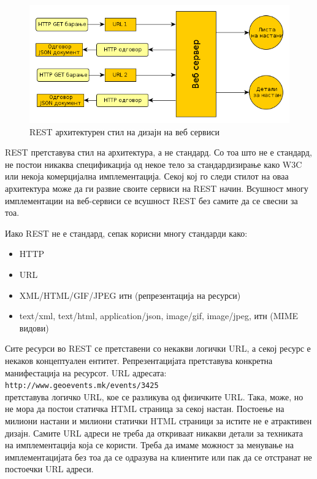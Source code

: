 \begin{figure}[htb]
\centering
\includegraphics[scale=0.4]{images/rest_architecture}
\caption{REST архитектурен стил на дизајн на веб сервиси}
\label{fig:rest_architecture}
\end{figure}
 
REST претставува стил
на архитектура, а не стандард. Со тоа што не е стандард, не постои никаква
спецификација од некое тело за стандардизирање како W3C или некоја комерцијална
имплементација. Секој кој го следи стилот на оваа архитектура може да ги развие
своите сервиси на REST начин. Всушност многу имплементации на веб-сервиси се
всушност REST без самите да се свесни за тоа. 

Иако REST не е стандард, сепак корисни многу стандарди како:
\begin{itemize}
  \item HTTP
  \item URL
  \item XML/HTML/GIF/JPEG итн (репрезентација на ресурси)
  \item text/xml, text/html, application/json, image/gif, image/jpeg, итн (MIME
видови) 
\end{itemize}
 
Сите ресурси во REST се претставени со некакви логички URL, а секој
ресурс е некаков концептуален ентитет. Репрезентацијата претставува конкретна
манифестација на ресурсот. URL адресата:
\\[.5cm]
\texttt{http://www.geoevents.mk/events/3425}
\\[.5cm]

претставува логичко URL, кое се разликува од физичките URL. Така, може, но не
мора да постои статичка HTML страница за секој настан. Постоење на милиони
настани и милиони статички HTML страници за истите не е атрактивен дизајн.
Самите URL адреси не треба да откриваат никакви детали за техниката на
имплементација која се користи. Треба да имаме можност за менување на
имплементацијата без тоа да се одразува на клиентите или пак да се отстранат не
постоечки URL адреси. 


